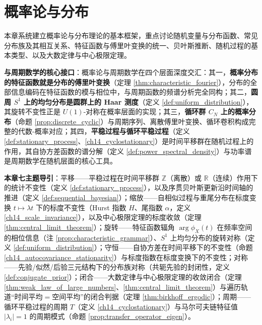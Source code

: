 \chapter{概率论与分布}
\label{chap:probability}

\begin{remark}[本章定位]\label{rem:probability_chapter_positioning}
本章系统建立概率论与分布理论的基本框架，重点讨论随机变量与分布函数、常见分布族及其相互关系、特征函数与傅里叶变换的统一、贝叶斯推断、随机过程的基本类型、以及大数定律与中心极限定理。

\textbf{与周期数学的核心接口}：概率论与周期数学在四个层面深度交汇：其一，\textbf{概率分布的特征函数就是分布的傅里叶变换}（定理 \ref{thm:characteristic_fourier}），分布的全部信息编码在特征函数的模与相位中，与周期函数的频谱分析完全同构；其二，\textbf{圆周 $S^1$ 上的均匀分布是圆群上的 Haar 测度}（定义 \ref{def:uniform_distribution}），其旋转不变性正是 $U(1)$-对称在概率层面的实现；其三，\textbf{循环群 $C_N$ 上的概率分布}（命题 \ref{prop:discrete_cyclic}）与周期序列、离散傅里叶变换、循环卷积构成完整的代数-概率对应；其四，\textbf{平稳过程与循环平稳过程}（定义 \ref{def:stationary_process}、\ref{ch14_cyclostationary}）是时间平移群在随机过程上的作用，其自协方差函数的谱分解（定义 \ref{def:power_spectral_density}）与功率谱是周期数学在随机层面的核心工具。

\textbf{本章七主题导引}：平移——平稳过程在时间平移群 $\mathbb{Z}$（离散）或 $\mathbb{R}$（连续）作用下的统计不变性（定义 \ref{def:stationary_process}），以及序贯贝叶斯更新沿时间轴的推进（定义 \ref{def:sequential_bayesian}）；缩放——自相似过程与重尾分布在标度变换 $t\mapsto\lambda t$ 下的标度不变性（Hurst 指数 $H$、尾指数 $\alpha$，定义 \ref{ch14_scale_invariance}），以及中心极限定理的标度收敛（定理 \ref{thm:central_limit_theorem}）；旋转——特征函数辐角 $\arg\phi_X(t)$ 在频率空间的相位信息（注 \ref{prop:characteristic_grammar}）、$S^1$ 上均匀分布的旋转对称（定义 \ref{def:uniform_distribution}）；守恒——自协方差在时间平移下的不变性（命题 \ref{ch14_autocovariance_stationarity}）与标度指数在标度变换下的不变性；对称——先验/似然/后验三元结构下的分布族对称（共轭先验的封闭性，定义 \ref{def:conjugate_prior}）；闭合——大数定律与中心极限定理的收敛闭合（定理 \ref{thm:weak_law_of_large_numbers}、\ref{thm:central_limit_theorem}）与遍历轨道“时间平均$=$空间平均”的闭合判据（定理 \ref{thm:birkhoff_ergodic}）；周期——循环平稳过程的周期 $T$（定义 \ref{ch14_cyclostationary}）与马尔可夫链特征值 $|\lambda_i|=1$ 的周期模式（命题 \ref{prop:transfer_operator_eigen}）。
\end{remark}

